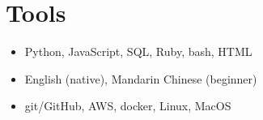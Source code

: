 \documentclass{cultvoucher}
\begin{document}
\section{Tools}
\begin{itemize}
	\item Python, JavaScript, SQL, Ruby, bash, HTML
	\item English (native), Mandarin Chinese (beginner)
\end{itemize}
\begin{itemize}
	\item git/GitHub, AWS, docker, Linux, MacOS
\end{itemize}
\end{document}
